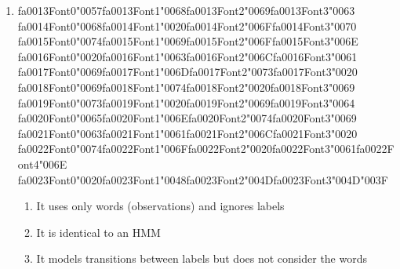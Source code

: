 \documentclass[12pt]{article}
\begin{document}
\begin{enumerate}[label=Q\arabic*.]
\begin{enumerate}[label=(\Alph*)]
    \item Beginning of an entity
    \item Inside an entity
    \item Outside any entity
    \item Between two tokens
\end{enumerate}
\item {\csname fa0013Font0\endcsname\char"0057}{\csname fa0013Font1\endcsname\char"0068}{\csname fa0013Font2\endcsname\char"0069}{\csname fa0013Font3\endcsname\char"0063} {\csname fa0014Font0\endcsname\char"0068}{\csname fa0014Font1\endcsname\char"0020}{\csname fa0014Font2\endcsname\char"006F}{\csname fa0014Font3\endcsname\char"0070} {\csname fa0015Font0\endcsname\char"0074}{\csname fa0015Font1\endcsname\char"0069}{\csname fa0015Font2\endcsname\char"006F}{\csname fa0015Font3\endcsname\char"006E} {\csname fa0016Font0\endcsname\char"0020}{\csname fa0016Font1\endcsname\char"0063}{\csname fa0016Font2\endcsname\char"006C}{\csname fa0016Font3\endcsname\char"0061} {\csname fa0017Font0\endcsname\char"0069}{\csname fa0017Font1\endcsname\char"006D}{\csname fa0017Font2\endcsname\char"0073}{\csname fa0017Font3\endcsname\char"0020} {\csname fa0018Font0\endcsname\char"0069}{\csname fa0018Font1\endcsname\char"0074}{\csname fa0018Font2\endcsname\char"0020}{\csname fa0018Font3\endcsname\char"0069} {\csname fa0019Font0\endcsname\char"0073}{\csname fa0019Font1\endcsname\char"0020}{\csname fa0019Font2\endcsname\char"0069}{\csname fa0019Font3\endcsname\char"0064} {\csname fa0020Font0\endcsname\char"0065}{\csname fa0020Font1\endcsname\char"006E}{\csname fa0020Font2\endcsname\char"0074}{\csname fa0020Font3\endcsname\char"0069} {\csname fa0021Font0\endcsname\char"0063}{\csname fa0021Font1\endcsname\char"0061}{\csname fa0021Font2\endcsname\char"006C}{\csname fa0021Font3\endcsname\char"0020} {\csname fa0022Font0\endcsname\char"0074}{\csname fa0022Font1\endcsname\char"006F}{\csname fa0022Font2\endcsname\char"0020}{\csname fa0022Font3\endcsname\char"0061}{\csname fa0022Font4\endcsname\char"006E} {\csname fa0023Font0\endcsname\char"0020}{\csname fa0023Font1\endcsname\char"0048}{\csname fa0023Font2\endcsname\char"004D}{\csname fa0023Font3\endcsname\char"004D}{\char"003F}
\begin{enumerate}[label=(\Alph*)]
    \item It uses only words (observations) and ignores labels
    \item It is identical to an HMM
    \item It models transitions between labels but does not consider the words

\end{enumerate}
\end{enumerate}
\end{document}
